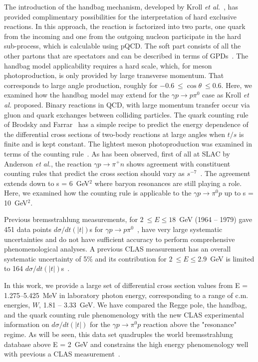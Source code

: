 \documentclass[aps,prc,twocolumn,floatfix,showpacs,preprintnumbers,amsmath,amssymb,superscriptaddress]{revtex4-1}
\begin{document}
The introduction of the handbag mechanism, 
developed by Kroll \textit{et al.}~\cite{Kroll}, has provided 
complimentary possibilities for the interpretation of hard 
exclusive reactions. In this approach, the reaction is factorized 
into two parts, one quark from the incoming and one from the 
outgoing nucleon participate in the hard sub-process, which is 
calculable using pQCD. The soft part consists of all the 
other partons that are spectators and can be described in 
terms of GPDs~\cite{HM}. The handbag model applicability 
requires a hard scale, which, for meson photoproduction, is only 
provided by large transverse momentum. That corresponds to large 
angle production, roughly
for $-0.6~\leq\cos\theta~\leq 0.6$.  Here, we examined how 
the handbag model may extend for the $\gamma p\to p\pi^0$ 
case as Kroll \textit{et al.} proposed.  
Binary reactions in QCD, with large momentum 
transfer occur via 
gluon and quark exchanges between colliding particles. The 
quark counting rule of Brodsky and 
Farrar~\cite{Stan} has a simple recipe to predict the energy 
dependence of the differential cross sections of two-body
reactions at large angles when $t/s$ is finite and is kept 
constant.  The lightest meson photoproduction was examined 
in terms of the counting rule~\cite{Anderson,Jenkins,Zhu,
Chen,Kong}. As has been observed, first of all at SLAC by 
Anderson \textit{et al.}, the reaction $\gamma p\to\pi^+n$ 
shows agreement with constituent counting rules that predict 
the cross section should vary as $s^{-7}$~\cite{Anderson}. 
The agreement extends down to s = 6~GeV$^2$ where baryon 
resonances are still playing a role.  Here, we examined how
the counting rule is applicable to the $\gamma p\to\pi^0p$ 
up to s = 10~GeV$^2$.

Previous bremsstrahlung measurements, for $2~\leq E\leq 
18$~GeV (1964 -- 1979) gave 451 data points $d\sigma/dt(|t|)$s for 
$\gamma p\to p\pi^0$~\cite{brem}, have very large systematic uncertainties and do not 
have sufficient accuracy to perform comprehensive 
phenomenological analyses.  
A previous CLAS measurement has an overall systematic uncertainty of 5\% and 
its contribution for $2~\leq E\leq 2.9$~GeV is limited to 
164 $d\sigma/dt(|t|)$s~\cite{du07}.  

In this work, we provide a large set of differential cross section values from 
E = 1.275--5.425~MeV in laboratory photon energy, 
corresponding to a range of c.m. energies, $W$, 1.81 -- 3.33~GeV.  
We have 
compared the Regge pole, the
handbag, and the quark counting rule phenomenology with the 
new CLAS experimental information on $d\sigma/dt(|t|)$ 
for the $\gamma p\to\pi^0p$ reaction above the "resonance" regime. As will 
be seen, this data set quadruples the world bremsstrahlung 
database above E = 2~GeV and constrains the high energy 
phenomenology well with previous a CLAS measurement~\cite{du07}.
\end{document}
